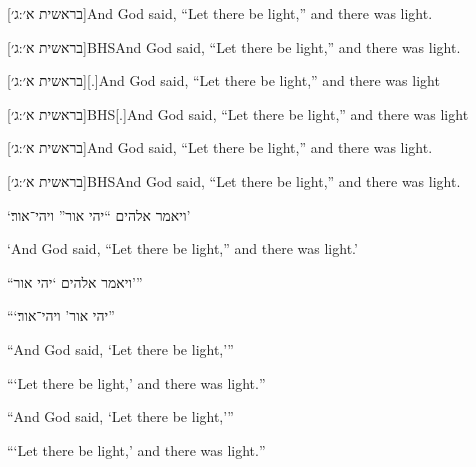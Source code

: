 \documentclass[12pt]{article}
\begin{document}
[בראשית א׳:ג׳]{And God said, \enquote{Let there be
light,} and there was light}.

[בראשית א׳:ג׳]{BHS}{And God said, \enquote{Let
there be light,} and there was light}.

[בראשית א׳:ג׳][.]{And God said, \enquote{Let there
be light,} and there was light}

[בראשית א׳:ג׳]{BHS}[.]{And God said, \enquote{Let
there be light,} and there was light}

[בראשית א׳:ג׳]{And God said, \enquote{Let there be
light,} and there was light.}

[בראשית א׳:ג׳]{BHS}{And God said, \enquote{Let
there be light,} and there was light.}

‘ויאמר אלהים “יהי אור” ויהי־אור׃’

\textenglish{‘And God said, “Let there be light,” and there was light.’}

\enquote{ויאמר אלהים \enquote{יהי אור}}

\enquote{\enquote{יהי אור} ויהי־אור׃}

\foreignquote{english}{And God said, \enquote{Let there be light,}}

\foreignquote{english}{\enquote{Let there be light,} and there was light.}

\hyphenquote{english}{And God said, \enquote{Let there be light,}}

\hyphenquote{english}{\enquote{Let there be light,} and there was light.}

\printbibliography
\end{document}
